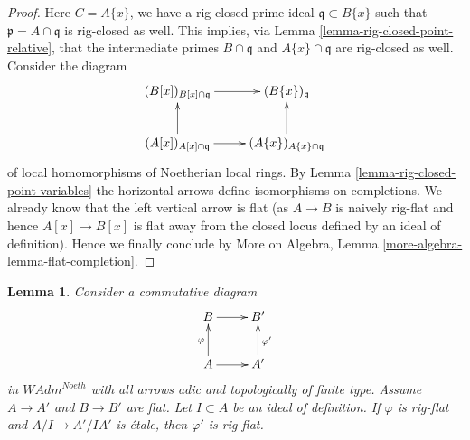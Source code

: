 \documentclass{stacks-project}
\theoremstyle{plain}
\newtheorem{lemma}[subsection]{Lemma}
\theoremstyle{definition}
\theoremstyle{remark}
\numberwithin{equation}{subsection}
\begin{document}
\begin{proof}
\medskip\noindent
Here $C = A\{x\}$, we have a rig-closed prime ideal
$\mathfrak q \subset B\{x\}$ such that
$\mathfrak p = A \cap \mathfrak q$ is rig-closed as well.
This implies, via Lemma \ref{lemma-rig-closed-point-relative},
that the intermediate primes $B \cap \mathfrak q$ and
$A\{x\} \cap \mathfrak q$ are rig-closed as well.
Consider the diagram
$$
\xymatrix{
(B[x])_{B[x] \cap \mathfrak q} \ar[r] &
(B\{x\})_{\mathfrak q} \\
(A[x])_{A[x] \cap \mathfrak q} \ar[r] \ar[u] &
(A\{x\})_{A\{x\} \cap \mathfrak q} \ar[u]
}
$$
of local homomorphisms of Noetherian local rings.
By Lemma \ref{lemma-rig-closed-point-variables}
the horizontal arrows define isomorphisms
on completions. We already know that the left
vertical arrow is flat (as $A \to B$ is naively rig-flat
and hence $A[x] \to B[x]$ is flat away from the
closed locus defined by an ideal of definition).
Hence we finally conclude by
More on Algebra, Lemma \ref{more-algebra-lemma-flat-completion}.
\end{proof}

\begin{lemma}
\label{lemma-rig-flat-local-etale}
Consider a commutative diagram
$$
\xymatrix{
B \ar[r] & B' \\
A \ar[r] \ar[u]^\varphi & A' \ar[u]_{\varphi'}
}
$$
in $\textit{WAdm}^{Noeth}$ with all arrows adic and topologically
of finite type. Assume $A \to A'$ and $B \to B'$ are flat.
Let $I \subset A$ be an ideal of definition.
If $\varphi$ is rig-flat and $A/I \to A'/IA'$
is \'etale, then $\varphi'$ is rig-flat.
\end{lemma}
\end{document}
